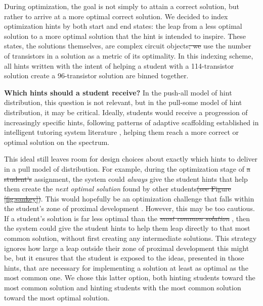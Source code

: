 \documentclass[12pt,twoside]{mitthesis}
\providecommand{\DIFaddtex}[1]{{\protect\color{blue}\uwave{#1}}} %
\providecommand{\DIFdeltex}[1]{{\protect\color{red}\sout{#1}}}                      %
\providecommand{\DIFaddbegin}{} %
\providecommand{\DIFaddend}{} %
\providecommand{\DIFdelbegin}{} %
\providecommand{\DIFdelend}{} %
\providecommand{\DIFadd}[1]{\texorpdfstring{\DIFaddtex{#1}}{#1}} %
\providecommand{\DIFdel}[1]{\texorpdfstring{\DIFdeltex{#1}}{}} %
\begin{document}
{{{{{{{{{{During optimization, the goal is not simply to attain a correct solution, but rather to arrive at a more optimal correct solution. We decided to index optimization hints by both start and end states: the leap from a less optimal solution to a more optimal solution that the hint is intended to inspire. These states, the solutions themselves, are complex circuit objects\DIFdelbegin \DIFdel{; we }\DIFdelend \DIFaddbegin \DIFadd{. We }\DIFaddend use the number of transistors in a solution as a metric of its optimality. In this indexing scheme, all hints written with the intent of helping a student with a 114-transistor solution create a 96-transistor solution are binned together.

{\DIFdelbegin %
\DIFdelend \DIFaddbegin \bf \DIFaddend Which hints should a student receive?} In the push-all model of hint distribution, this question is not relevant, but in the pull-some model of hint distribution, it may be critical. Ideally, students would receive a progression of increasingly specific hints, following patterns of adaptive scaffolding established in intelligent tutoring system literature \cite{andes}, helping them reach a more correct or optimal solution on the spectrum. 

This ideal still leaves room for design choices about exactly which hints to deliver in a pull model of distribution. For example, during the optimization stage of \DIFdelbegin \DIFdel{a student's }\DIFdelend \DIFaddbegin \DIFadd{an }\DIFaddend assignment, the system could \textit{always} give the student hints that help them create the \textit{next optimal solution} found by other students\DIFdelbegin \DIFdel{(see Figure \ref{fig:sankey})}\DIFdelend . This would hopefully be an optimization challenge that falls within the student's zone of proximal development \cite{ZMP}. However, this may be too cautious. If a student's solution is far less optimal than the \DIFdelbegin \textit{\DIFdel{most common solution}}%
\DIFdelend \DIFaddbegin \DIFadd{most common solution}\DIFaddend , then the system could give the student hints to help them leap directly to that most common solution, without first creating any intermediate solutions. This strategy ignores how large a leap outside their zone of proximal development this might be, but it ensures that the student is exposed to the ideas, presented in those hints, that are necessary for implementing a solution at least as optimal as the most common one. We chose this latter option, both hinting students toward the most common solution and hinting students with the most common solution toward the most optimal solution.

}}}}}}}}}}
\end{document}
